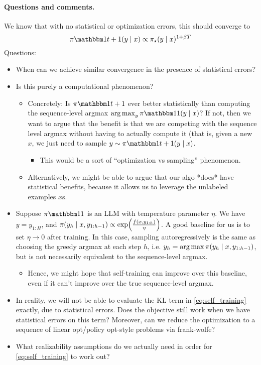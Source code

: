 \documentclass{article}
\newcommand{\dfc}[1]{\dfcomment{#1}}
\let\oldparagraph\paragraph
\renewcommand{\paragraph}[1]{\oldparagraph{#1.}}
\begin{document}
\paragraph{Questions and comments}
We know that with no statistical or optimization errors, this
  should converge to
  \[
    \pi\ind{t+1}(y\mid{}x)\propto{}\pistar(y\mid{}x)^{1+\beta{}T}
  \]
  \dfc{Check this!}
  Questions:
\begin{itemize}
\item When can we achieve similar convergence in the presence of
  statistical errors?
\item Is this purely a computational phenomenon?
  \begin{itemize}
  \item Concretely: Is $\pi\ind{t+1}$ ever better statistically than
    computing the sequence-level argmax
    $\argmax_{y}\pi\ind{1}(y\mid{}x)$? If not, then we want to argue
    that the benefit is that we are competing with the sequence level
    argmax without having to actually compute it (that is, given a new
    $x$, we just need to sample $y\sim{}\pi\ind{t+1}(y\mid{}x)$.
    \begin{itemize}
    \item This would be a sort of ``optimization vs sampling'' phenomenon.
    \end{itemize}
  \item Alternatively, we might be able to argue that our algo *does*
    have statistical benefits, because it allows us to leverage the
    unlabeled examples $x$s.
  \end{itemize}
\item Suppose $\pi\ind{1}$ is an LLM with temperature parameter
  $\eta$. We have $y=y_{1:H}$, and
  $\pi(y_h\mid{}x,y_{1:h-1})\propto\exp\prn*{\frac{f(x,y_{1:h})}{\eta}}$. A
  good baseline for us is to set $\eta\to{}0$ after training. In this
  case, sampling autoregressively is the same as choosing the greedy
  argmax at each step $h$,
  i.e. $y_h=\operatorname*{arg\,max}{}\pi(y_h\mid{}x,y_{1:h-1})$, but is not
  necessarily equivalent to the sequence-level argmax.
  \begin{itemize}
  \item Hence, we might hope that self-training can improve over this
    baseline, even if it can't improve over the true sequence-level argmax.
  \end{itemize}
\item In reality, we will not be able to evaluate the KL term in
  \cref{eq:self_training} exactly, due to statistical errors. Does the
  objective still work when we have statistical errors on this term?
  Moreover, can we reduce the optimization to a sequence of linear
  opt/policy opt-style problems via frank-wolfe?
\item What realizability assumptions do we actually need in order for
  \cref{eq:self_training} to work out?
\end{itemize}
\end{document}
